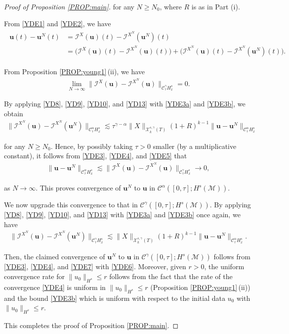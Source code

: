 \documentclass[letterpaper, 11pt,  reqno]{amsart}
\newcommand{\1}{\hspace{0.5mm}\text{I}\hspace{0.5mm}}
\newcommand{\I}{\mathcal{I}}
\newcommand{\noi}{\noindent}
\newcommand{\CC}{\mathcal{C}}
\newcommand{\al}{\alpha}
\newcommand{\g}{\gamma}
\newcommand{\les}{\lesssim}
\newcommand{\M}{\mathcal{M}}
\newcommand{\cC}{\mathcal{C}}
\newcommand{\cX}{\mathcal{X}}
\newcommand{\uu}{\mathbf{u}}
\newcommand{\too}{\longrightarrow}
\numberwithin{equation}{section}
\numberwithin{theorem}{section}
\begin{document}
\begin{proof}[Proof of Proposition \ref{PROP:main}]
\noi
for any $N \ge N_0$, where $R$ is as in Part (i).


From \eqref{YDE1} and \eqref{YDE2}, we have
\begin{align}
\label{YDE3}
\begin{split}
\uu(t) - \uu^N(t) 
& = 
 \I^{X}(\uu)(t)-  
 \I^{X^N}(\uu^N)(t)\\
& = 
\Big( \I^{X}(\uu)(t)-  
 \I^{X^N}(\uu)(t)\Big)
 + \Big(\I^{X^N}(\uu)(t)- 
 \I^{X^N}(\uu^N)(t)\Big).
\end{split}
\end{align}


\noi
From 
Proposition \ref{PROP:young1}\,(ii), 
we have 
\begin{align}
\lim_{N\to \infty }\| \I^{X}(\uu)-  
 \I^{X^N}(\uu)\|_{\CC^\g_\tau H^s_x} = 0.
\label{YDE4}
\end{align}




\noi
By applying
 \eqref{YD8}, 
\eqref{YD9}, \eqref{YD10}, and \eqref{YD13}
with \eqref{YDE3a} and \eqref{YDE3b}, 
we obtain
\begin{align}
\| \I^{X^N}(\uu)- 
 \I^{X^N}(\uu^N)\|_{\cC^\al _{\tau} H^s_x}
\les 
\tau^{\g - \al}\|X\|_{\cX^{s, \g}_k(T)}  (1+R)^{k-1}\|\uu- \uu^N \|_{\CC^\al _\tau H^s_x}
\label{YDE5}
\end{align}

\noi
for any $N \ge N_0$.
Hence, 
 by possibly taking $\tau > 0$ smaller (by a multiplicative constant), 
it follows 
from \eqref{YDE3}, 
\eqref{YDE4}, 
and \eqref{YDE5} that 
\begin{align}
\|\uu- \uu^N \|_{\CC^\al _\tau H^s_x}
\les 
\| \I^{X}(\uu)-  
 \I^{X^N}(\uu)\|_{\CC^\g_\tau H^s_x} \too 0, 
\label{YDE6}
\end{align}


\noi
as $N \to \infty$.
This proves convergence of $\uu^N$ to $\uu$ in 
 $\CC^\al([0, \tau]; H^s(\M))$.


We now upgrade this convergence to that 
 in $\CC^\g([0, \tau]; H^s(\M))$.
By applying  \eqref{YD8}, 
\eqref{YD9}, \eqref{YD10}, and \eqref{YD13}
with \eqref{YDE3a} and \eqref{YDE3b}
 once again, 
we have
\begin{align}
\| \I^{X^N}(\uu)- 
 \I^{X^N}(\uu^N)\|_{\cC^\g _{\tau} H^s_x}
\les 
\|X\|_{\cX^{s, \g}_k(T)}  (1+R)^{k-1}\|\uu- \uu^N \|_{\CC^\al _\tau H^s_x}.
\label{YDE7}
\end{align}

\noi
Then, the claimed convergence of $\uu^N$ to $\uu$ 
 in $\CC^\g([0, \tau]; H^s(\M))$
 follows from \eqref{YDE3}, 
 \eqref{YDE4}, and \eqref{YDE7} with \eqref{YDE6}. 
Moreover, given $r > 0$, 
the uniform convergence rate for $\|u_0\|_{H^s}\le r$
follows
from the fact that the 
rate of the convergence \eqref{YDE4}
is uniform in 
$\|u_0\|_{H^s}\le r$ 
(Proposition \ref{PROP:young1}\,(ii))
and the bound \eqref{YDE3b}
which is uniform with respect to the initial data
$u_0$ 
with $\|u_0\|_{H^s}\le r$.

This completes the proof of Proposition \ref{PROP:main}.
\end{proof}
\end{document}
